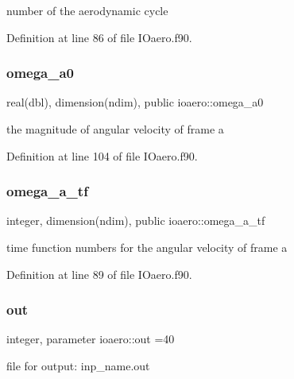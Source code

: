 number of the aerodynamic cycle 



Definition at line 86 of file I\+Oaero.\+f90.

\mbox{\label{namespaceioaero_a38fc5ef87ae7c2e312ad32f857e791cb}} 
\subsubsection{\texorpdfstring{omega\+\_\+a0}{omega\_a0}}
{\footnotesize\ttfamily real(dbl), dimension(ndim), public ioaero\+::omega\+\_\+a0}



the magnitude of angular velocity of frame a 



Definition at line 104 of file I\+Oaero.\+f90.

\mbox{\label{namespaceioaero_a9ec25357ecfc1c09628efa147300aaee}} 
\subsubsection{\texorpdfstring{omega\+\_\+a\+\_\+tf}{omega\_a\_tf}}
{\footnotesize\ttfamily integer, dimension(ndim), public ioaero\+::omega\+\_\+a\+\_\+tf}



time function numbers for the angular velocity of frame a 



Definition at line 89 of file I\+Oaero.\+f90.

\mbox{\label{namespaceioaero_a7c01d4bcd841d8d6281f29d5fc818fd8}} 
\subsubsection{\texorpdfstring{out}{out}}
{\footnotesize\ttfamily integer, parameter ioaero\+::out =40\hspace{0.3cm}{\ttfamily [private]}}



file for output\+: inp\+\_\+name.\+out 



